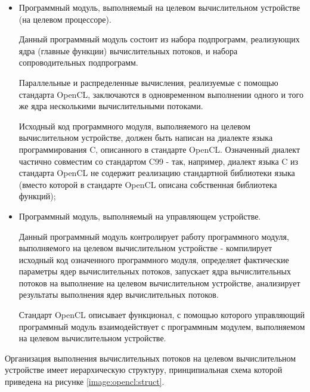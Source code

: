 \begin{itemize}

	\item Программный модуль, выполняемый на целевом вычислительном устройстве (на целевом процессоре).
	
		Данный программный модуль состоит из набора подпрограмм, реализующих ядра (главные функции) вычислительных потоков, и набора сопроводительных подпрограмм.

		Параллельные и распределенные вычисления, реализуемые с помощью стандарта OpenCL, заключаются в одновременном выполнении одного и того же ядра несколькими вычислительными потоками.

		Исходный код программного модуля, выполняемого на целевом вычислительном устройстве, должен быть написан на диалекте языка программирования C, описанного в стандарте OpenCL. Означенный диалект частично совместим со стандартом C99 - так, например, диалект языка C из стандарта OpenCL не содержит реализацию стандартной библиотеки языка (вместо которой в стандарте OpenCL описана собственная библиотека функций);

	\item Программный модуль, выполняемый на управляющем устройстве.

		Данный программный модуль контролирует работу программного модуля, выполняемого на целевом вычислительном устройстве - компилирует исходный код означенного программного модуля, определяет фактические параметры ядер вычислительных потоков, запускает ядра вычислительных потоков на выполнение на целевом вычислительном устройстве, анализирует результаты выполнения ядер вычислительных потоков.

		Стандарт OpenCL описывает функционал, с помощью которого управляющий программный модуль взаимодействует с программным модулем, выполняемом на целевом вычислительном устройстве.

\end{itemize}

Организация выполнения вычислительных потоков на целевом вычислительном устройстве имеет иерархическую структуру, принципиальная схема которой приведена на рисунке \ref{image:opencl:struct}.

\begin{landscape}
~
\vfill
{}
\vfill
~
\end{landscape}

